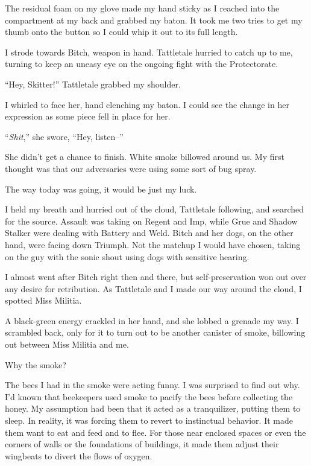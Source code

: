 The residual foam on my glove made my hand sticky as I reached into the compartment at my back and grabbed my baton.  It took me two tries to get my thumb onto the button so I could whip it out to its full length.



I strode towards Bitch, weapon in hand.  Tattletale hurried to catch up to me, turning to keep an uneasy eye on the ongoing fight with the Protectorate.



``Hey, Skitter!'' Tattletale grabbed my shoulder.



I whirled to face her, hand clenching my baton.  I could see the change in her expression as some piece fell in place for her.



``\emph{Shit},'' she swore, ``Hey, listen--''



She didn't get a chance to finish.  White smoke billowed around us.  My first thought was that our adversaries were using some sort of bug spray.



The way today was going, it would be just my luck.



I held my breath and hurried out of the cloud, Tattletale following, and searched for the source.  Assault was taking on Regent and Imp, while Grue and Shadow Stalker were dealing with Battery and Weld.  Bitch and her dogs, on the other hand, were facing down Triumph.  Not the matchup I would have chosen, taking on the guy with the sonic shout using dogs with sensitive hearing.



I almost went after Bitch right then and there, but self-preservation won out over any desire for retribution.  As Tattletale and I made our way around the cloud, I spotted Miss Militia.



A black-green energy crackled in her hand, and she lobbed a grenade my way.  I scrambled back, only for it to turn out to be another canister of smoke, billowing out between Miss Militia and me.



Why the smoke?



The bees I had in the smoke were acting funny.  I was surprised to find out why.  I'd known that beekeepers used smoke to pacify the bees before collecting the honey.  My assumption had been that it acted as a tranquilizer, putting them to sleep.  In reality, it was forcing them to revert to instinctual behavior.  It made them want to eat and feed and to flee.  For those near enclosed spaces or even the corners of walls or the foundations of buildings, it made them adjust their wingbeats to divert the flows of oxygen.



